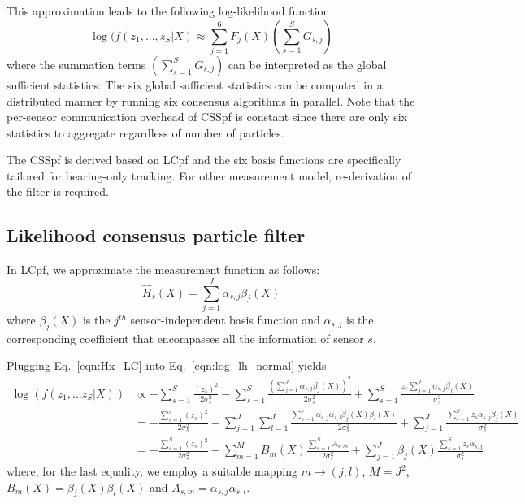 \documentclass[10pt,letterpaper,final]{article}
\begin{document}
This approximation leads to the following log-likelihood function
\begin{equation}
\log(f(z_1,..., z_S|X) \approx \sum_{j=1}^6 F_j(X) \left(\sum_{s=1}^S G_{s,j}\right)
\label{eqn:llh_css}
\end{equation}
where the summation terms $\left(\sum_{s=1}^S G_{s,j}\right)$ can be interpreted as the global sufficient statistics. The six global sufficient statistics can be computed in a distributed manner by running six consensus algorithms in parallel. Note that the per-sensor communication overhead of CSSpf is constant since there are only six statistics to aggregate regardless of number of particles. 

The CSSpf is derived based on LCpf and the six basis functions are specifically tailored for bearing-only tracking. For other measurement model, re-derivation of the filter is required. 

\subsection{Likelihood consensus particle filter}
In LCpf, we approximate the measurement function as follows:
\begin{equation}
\hat{H}_s(X) = \sum_{j=1}^J \alpha_{s,j} \beta_j(X)
\label{eqn:Hx_LC}
\end{equation}
where $\beta_j(X)$ is the $j^{th}$ sensor-independent basis function and $\alpha_{s,j}$ is the corresponding coefficient that encompasses all the information of sensor $s$. 

Plugging Eq.~\eqref{eqn:Hx_LC} into Eq.~\eqref{eqn:log_lh_normal} yields
\begin{align}
\log(f(z_1,...z_S|X)) &\propto -\sum_{s=1}^S \frac{(z_s)^2}{2\sigma_s^2} -\sum_{s=1}^S \frac{\left( \sum_{j=1}^J \alpha_{s,j} \beta_j(X)\right)^2}{2\sigma_s^2} + \sum_{s=1}^S \frac{z_s\sum_{j=1}^J \alpha_{s,j} \beta_j(X)}{\sigma_s^2} \nonumber \\
&= -\frac{\sum_{s=1}^s(z_s)^2}{2\sigma_s^2} - \sum_{j=1}^J\sum_{l=1}^J\frac{\sum_{s=1}^s \alpha_{s,j}\alpha_{s,l} \beta_j(X)\beta_l(X)}{2\sigma_s^2}+ \sum_{j=1}^J\frac{\sum_{s=1}^S z_s \alpha_{s,j} \beta_j(X)}{\sigma_s^2} \nonumber \\
&= -\frac{\sum_{s=1}^S(z_s)^2}{2\sigma_s^2} - \sum_{m=1}^MB_{m}(X)\frac{\sum_{s=1}^S A_{s,m} }{2\sigma_s^2}+ \sum_{j=1}^J\beta_j(X)\frac{\sum_{s=1}^S z_s \alpha_{s,j} }{\sigma_s^2} 
\label{eqn:joint_log_lh_LC}
\end{align}
where, for the last equality, we employ a suitable mapping $m\rightarrow (j,l)$, $M=J^2$, $B_m(X)=\beta_j(X)\beta_l(X)$ and $A_{s,m} = \alpha_{s,j}\alpha_{s,l}$. 
\end{document}
